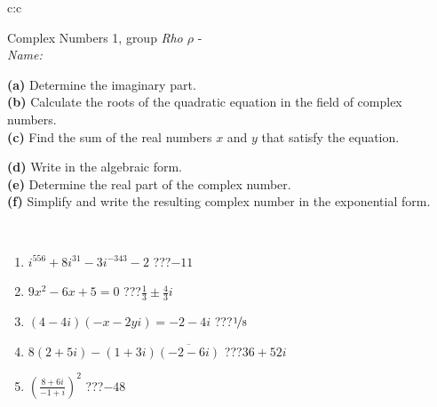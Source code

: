 \documentclass[10pt]{report}
\begin{document}
\begin{tabular}{c:c}
\begin{minipage}[c][104.5mm][t]{0.5\linewidth}
\begin{center}
\vspace{5mm}
{\huge Complex Numbers 1, group \textit{Rho $\rho$} -}\\[5mm]
\textit{Name:}\phantom{xxxxxxxxxxxxxxxxxxxxxxxxxxxxxxxxxxxxxxxxxxxxxxxxxxxxxxxxxxxxxxxxx}\\[5mm]
\begin{minipage}{0.95\linewidth}
\begin{center}
{\small \begin{minipage}{0.44\textwidth} \raggedright
\textbf{(a)} Determine the imaginary part. \\[1mm]
\textbf{(b)} Calculate the roots of the quadratic equation in the field of complex numbers. \\[1mm]
\textbf{(c)} Find the sum of the real numbers \(x\) and \(y\) that satisfy the equation. \end{minipage} \begin{minipage}{0.54\textwidth}
\textbf{(d)} Write in the algebraic form. \\[1mm]
\textbf{(e)} Determine the real part of the complex number. \\[1mm]
\textbf{(f)} Simplify and write the resulting complex number in the exponential form.
\end{minipage}
} \vspace{3mm}
\end{center}
\end{minipage}
\\[1mm]
\begin{minipage}{0.79\linewidth}
\begin{center}
\begin{varwidth}{\linewidth}
\setlength{\itemsep}{0pt}
\begin{enumerate}
\large
\item $i^{556}+8i^{31}-3i^{-343}-2$\quad \dotfill\; ???\;\dotfill \quad $-11$
\item $9x^2-6x+5=0$\quad \dotfill\; ???\;\dotfill \quad $\frac{1}{3} \pm{}\frac{4}{3}i$
\item $(4-4i)(-x-2yi)=-2-4i$\quad \dotfill\; ???\;\dotfill \quad $\nicefrac{1}{8}$
\item $8(2+5i)-(1+3i)\overline{(-2-6i)}$\quad \dotfill\; ???\;\dotfill \quad $36+52i$
\item $\left(\frac{8+6i}{-1+i}\right)^2$\quad \dotfill\; ???\;\dotfill \quad $-48$

\end{enumerate}
\end{varwidth}
\end{center}
\end{minipage}
\end{center}
\end{minipage}
\end{tabular}
\end{document}
